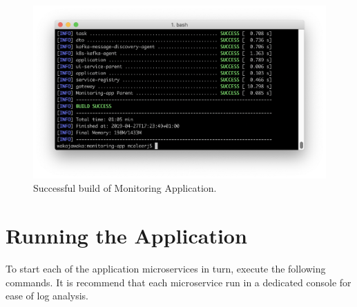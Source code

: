 \begin{itemize}
\begin{figure}[H]
	\centering  
	\includegraphics[width=\linewidth]{figures/appendixB/build-success.png}
	\caption{Successful build of Monitoring Application.}
	\label{monitoring_app_build_ok}
\end{figure}
\end{itemize}

\section{Running the Application}

To start each of the application microservices in turn, execute the following commands. It is recommend that each microservice run in a dedicated console for ease of log analysis.

